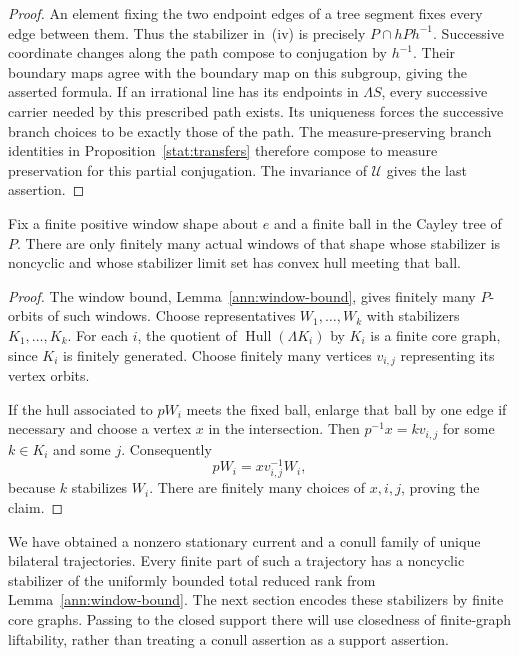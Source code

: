 \begin{proof}
An element fixing the two endpoint edges of a tree segment fixes
every edge between them.  Thus the stabilizer in~(iv) is precisely
$P\cap hPh^{-1}$.  Successive coordinate changes along the path
compose to conjugation by $h^{-1}$.  Their boundary maps agree with
the boundary map on this subgroup, giving the asserted formula.
If an irrational line has its endpoints in $\Lambda S$, every
successive carrier needed by this prescribed path exists.  Its
uniqueness forces the successive branch choices to be exactly
those of the path.  The measure-preserving branch identities in
Proposition~\ref{stat:transfers} therefore compose to measure
preservation for this partial conjugation.  The invariance of
$\mathcal U$ gives the last assertion.
\end{proof}

\begin{lemma}\label{stat:window-finiteness}
Fix a finite positive window shape about $e$ and a finite ball in the
Cayley tree of $P$.  There are only finitely many actual windows of
that shape whose stabilizer is noncyclic and whose stabilizer limit
set has convex hull meeting that ball.
\end{lemma}
\begin{proof}
The window bound, Lemma~\ref{ann:window-bound}, gives finitely many
$P$-orbits of such windows.  Choose representatives $W_1,\ldots,W_k$
with stabilizers $K_1,\ldots,K_k$.  For each $i$, the quotient of
$\operatorname{Hull}(\Lambda K_i)$ by $K_i$ is a finite core
graph, since $K_i$ is finitely generated.  Choose finitely many
vertices $v_{i,j}$ representing its vertex orbits.

If the hull associated to $pW_i$ meets the fixed ball, enlarge that
ball by one edge if necessary and choose a vertex $x$ in the
intersection.  Then $p^{-1}x=kv_{i,j}$ for some $k\in K_i$ and
some $j$.  Consequently
\[
                     pW_i=xv_{i,j}^{-1}W_i,
\]
because $k$ stabilizes $W_i$.  There are finitely many choices of
$x,i,j$, proving the claim.
\end{proof}

We have obtained a nonzero stationary current and a conull family of
unique bilateral trajectories.  Every finite part of such a
trajectory has a noncyclic stabilizer of the uniformly bounded
total reduced rank from Lemma~\ref{ann:window-bound}.  The next
section encodes these stabilizers by finite core graphs.  Passing
to the closed support there will use closedness of finite-graph
liftability, rather than treating a conull assertion as a support
assertion.
